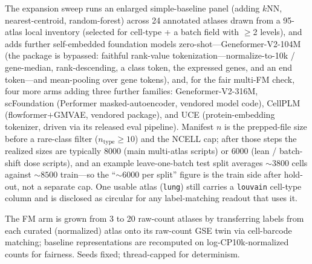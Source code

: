 \documentclass[fleqn,10pt,lineno]{wlpeerj}  %
\begin{document}
The expansion sweep runs an enlarged simple-baseline panel (adding $k$NN, nearest-centroid, random-forest) across 24 annotated atlases drawn from a 95-atlas local inventory (selected for cell-type + a batch field with $\geq$2 levels), and adds further self-embedded foundation models zero-shot---Geneformer-V2-104M (the package is bypassed: faithful rank-value tokenization---normalize-to-10k / gene-median, rank-descending, a class token, the expressed genes, and an end token---and mean-pooling over gene tokens), and, for the fair multi-FM check, four more arms adding three further families: Geneformer-V2-316M, scFoundation (Performer masked-autoencoder, vendored model code), CellPLM (flowformer$+$GMVAE, vendored package), and UCE (protein-embedding tokenizer, driven via its released eval pipeline). Manifest $n$ is the prepped-file size before a rare-class filter ($n_{\mathrm{type}}\!\ge\!10$) and the NCELL cap; after those steps the realized sizes are typically $8000$ (main multi-atlas scripts) or $6000$ (lean / batch-shift dose scripts), and an example leave-one-batch test split averages ${\sim}3800$ cells against ${\sim}8500$ train---so the ``${\sim}6000$ per split'' figure is the train side after hold-out, not a separate cap. One usable atlas (\texttt{lung}) still carries a \texttt{louvain} cell-type column and is disclosed as circular for any label-matching readout that uses it.

The FM arm is grown from 3 to 20 raw-count atlases by transferring labels from each curated (normalized) atlas onto its raw-count GSE twin via cell-barcode matching; baseline representations are recomputed on log-CP10k-normalized counts for fairness. Seeds fixed; thread-capped for determinism.
\end{document}
